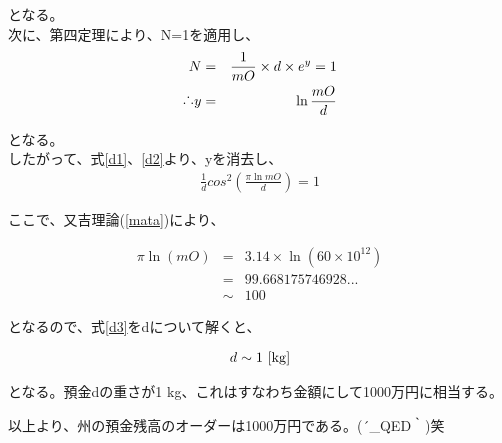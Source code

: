 となる。\\
次に、第四定理により、N=1を適用し、
\begin{eqnarray}
N&=&\frac{1}{mO} \times d \times e^{y} =1\\
\raisebox{.2ex}{.}\raisebox{1.2ex}{.}\raisebox{.2ex}{.} y&=&\ln\frac{mO}{d}
\label{d2}
\end{eqnarray}

となる。\\
したがって、式\ref{d1}、\ref{d2}より、yを消去し、
\begin{eqnarray}
 \frac{1}{d}cos^2(\frac{\pi \ln mO}{d}) =1
 \label{d3}
\end{eqnarray}

ここで、又吉理論(\ref{mata})により、

\begin{eqnarray}
 \pi \ln (mO) &=& 3.14\times \ln (60\times10^{12})\nonumber\\
 &=&99.668175746928...\nonumber\\
 &\sim&100
\end{eqnarray}

となるので、式\ref{d3}をdについて解くと、

\begin{eqnarray}
d \sim 1 \ [\rm{kg}]
\end{eqnarray}

となる。預金dの重さが1 kg、これはすなわち金額にして1000万円に相当する。
\begin{center}
\large{以上より、州の預金残高のオーダーは1000万円である。\sf(´\_QED｀)笑}
\end{center}


